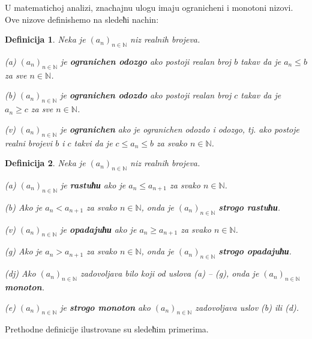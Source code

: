 \documentclass[11pt,a4paper]{article}
\newcommand{\lN}{\mathbb{N}}
\newtheorem{defi}{Definicija}[section]
\begin{document}
U matematichoj analizi, znachajnu ulogu imaju ogranicheni i 
monotoni nizovi. Ove nizove definishemo na 
sledeћi nachin: 

\begin{defi}
Neka je $(a_n)_{n\in\mathbb{N}}$ niz realnih brojeva.  

(a) $(a_n)_{n\in\mathbb{N}}$ je \textbf{ogranichen odozgo} ako postoji realan broj $b$ takav da je $a_n\leq b $ za sve $n \in \lN$.

(b) $(a_n)_{n\in\mathbb{N}}$ je \textbf{ogranichen odozdo} ako postoji realan broj $c$ takav da je $a_n \geq c $ za sve $n \in \lN$.

(v) $(a_n)_{n\in\mathbb{N}}$ je \textbf{ogranichen} ako je ogranichen odozdo i odozgo, tj. ako postoje realni brojevi $b$ i $c$ takvi da je $c \leq a_n \leq b$ za svako $n \in \lN$.
\end{defi}

\begin{defi}
Neka je $(a_n)_{n\in\mathbb{N}}$ niz realnih brojeva.  

(a) $(a_n)_{n\in\mathbb{N}}$ je 
\textbf{rastuћи} ako je $a_n \leq a_{n+1}$
za svako $n\in\mathbb{N}$. 

(b)  
Ako je $a_n < a_{n+1}$
za svako $n\in\mathbb{N}$, onda je 
$(a_n)_{n\in\mathbb{N}}$ 
\textbf{strogo rastuћи}. 

(v) $(a_n)_{n\in\mathbb{N}}$ je 
\textbf{opadajuћи} ako je $a_n \geq a_{n+1}$
za svako $n\in\mathbb{N}$. 

(g)  
Ako je $a_n > a_{n+1}$
za svako $n\in\mathbb{N}$, onda je 
$(a_n)_{n\in\mathbb{N}}$ 
\textbf{strogo opadajuћи}. 

(dj)
Ako $(a_n)_{n\in\mathbb{N}}$ zadovoljava bilo koji od uslova
(a) -- (g), onda je $(a_n)_{n\in\mathbb{N}}$ \textbf{monoton}. 

(e) $(a_n)_{n\in\mathbb{N}}$ je \textbf{strogo monoton}
ako $(a_n)_{n\in\mathbb{N}}$ zadovoljava uslov (b) ili (d). 
\end{defi}

Prethodne definicije ilustrovane su sledeћim primerima. 
\end{document}
